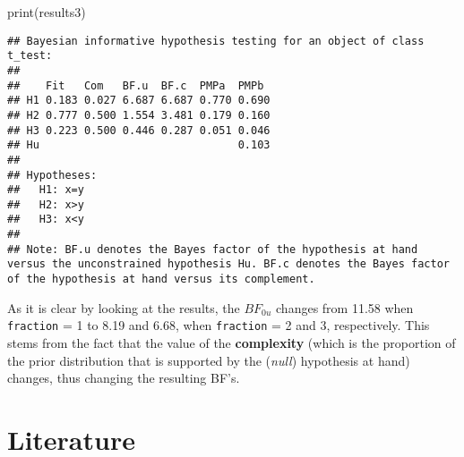 \documentclass[
]{book}
\newenvironment{Shaded}{\begin{snugshade}}{\end{snugshade}}
\newcommand{\FunctionTok}[1]{\textcolor[rgb]{0.00,0.00,0.00}{#1}}
\newcommand{\NormalTok}[1]{#1}
\begin{document}
\begin{Shaded}
\begin{Highlighting}[]
\FunctionTok{print}\NormalTok{(results3)}
\end{Highlighting}
\end{Shaded}

\begin{verbatim}
## Bayesian informative hypothesis testing for an object of class t_test:
## 
##    Fit   Com   BF.u  BF.c  PMPa  PMPb 
## H1 0.183 0.027 6.687 6.687 0.770 0.690
## H2 0.777 0.500 1.554 3.481 0.179 0.160
## H3 0.223 0.500 0.446 0.287 0.051 0.046
## Hu                               0.103
## 
## Hypotheses:
##   H1: x=y
##   H2: x>y
##   H3: x<y
## 
## Note: BF.u denotes the Bayes factor of the hypothesis at hand versus the unconstrained hypothesis Hu. BF.c denotes the Bayes factor of the hypothesis at hand versus its complement.
\end{verbatim}

As it is clear by looking at the results, the \(BF_{0u}\) changes from 11.58 when \texttt{fraction} = 1 to 8.19 and 6.68, when \texttt{fraction} = 2 and 3, respectively. This stems from the fact that the value of the \textbf{complexity} (which is the proportion of the prior distribution that is supported by the (\emph{null}) hypothesis at hand) changes, thus changing the resulting BF's.

\hypertarget{literature}{%
\chapter*{Literature}\label{literature}}
\end{document}
